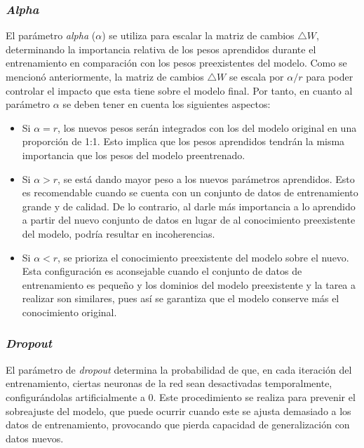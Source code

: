 \documentclass[11pt,spanish,listoffigures,listoftables]{tfgetsinf}
\begin{document}
\subsubsection{\textit{Alpha}}

El parámetro \textit{alpha} ($\alpha$) se utiliza para escalar la matriz de cambios $\bigtriangleup W$, determinando la importancia relativa de los pesos aprendidos durante el entrenamiento en comparación con los pesos preexistentes del modelo. Como se mencionó anteriormente, la matriz de cambios $\bigtriangleup W$ se escala por $\alpha / r$ para poder controlar el impacto que esta tiene sobre el modelo final. Por tanto, en cuanto al parámetro $\alpha$ se deben tener en cuenta los siguientes aspectos:

\begin{itemize}
	\item Si $\alpha = r$, los nuevos pesos serán integrados con los del modelo original en una proporción de 1:1. Esto implica que los pesos aprendidos tendrán la misma importancia que los pesos del modelo preentrenado.
	\item Si $\alpha > r$, se está dando mayor peso a los nuevos parámetros aprendidos. Esto es recomendable  cuando se cuenta con un conjunto de datos de entrenamiento grande y de calidad. De lo contrario, al darle más importancia a lo aprendido a partir del nuevo conjunto de datos en lugar de al conocimiento preexistente del modelo, podría resultar en incoherencias.
	\item Si $\alpha < r$, se prioriza el conocimiento preexistente del modelo sobre el nuevo. Esta configuración es aconsejable cuando el conjunto de datos de entrenamiento es pequeño y los dominios del modelo preexistente y la tarea a realizar son similares, pues así se garantiza que el modelo conserve más el conocimiento original.
\end{itemize}

\subsubsection{\textit{Dropout}}

El parámetro de \textit{dropout} determina la probabilidad de que, en cada iteración del entrenamiento, ciertas neuronas de la red sean desactivadas temporalmente, configurándolas artificialmente a 0. Este procedimiento se realiza para prevenir el sobreajuste del modelo, que puede ocurrir cuando este se ajusta demasiado a los datos de entrenamiento, provocando que pierda capacidad de generalización con datos nuevos.
\end{document}
